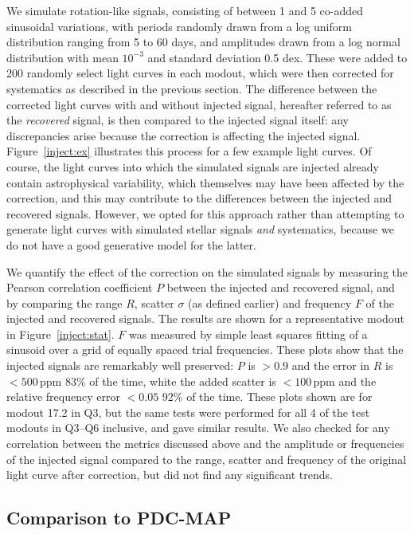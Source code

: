 \documentclass[useAMS,usenatbib]{mn2e}
\begin{document}
We simulate rotation-like signals, consisting of between 1 and 5 co-added
sinusoidal variations, with periods randomly drawn from a log uniform
distribution ranging from 5 to 60 days, and amplitudes drawn from a
log normal distribution with mean $10^{-3}$ and standard deviation 0.5
dex. These were added to 200 randomly select light curves in each
modout, which were then corrected for systematics as described in the
previous section. The difference between the corrected light curves
with and without injected signal, hereafter referred to as the
\emph{recovered} signal, is then compared to the injected
signal itself: any discrepancies arise because the correction is affecting
the injected signal. Figure~\ref{inject:ex} illustrates this process
for a few example light curves. Of course, the light curves into which the
simulated signals are injected already contain astrophysical
variability, which themselves may have been affected by the
correction, and this may contribute to the differences between the
injected and recovered signals. However, we opted for this approach
rather than attempting to generate light curves with simulated stellar
signals \emph{and} systematics, because we do not have a good
generative model for the latter. 

We quantify the effect of the correction on the simulated signals by
measuring the Pearson correlation coefficient $P$ between the injected
and recovered signal, and by comparing the range $R$, scatter $\sigma$
(as defined earlier) and frequency $F$ of the injected and recovered
signals. The results are shown for a representative modout in
Figure~\ref{inject:stat}. $F$ was measured by simple least squares
fitting of a sinusoid over a grid of equally spaced trial
frequencies. These plots show that the injected signals are remarkably
well preserved: $P$ is $>0.9$ and the error in $R$ is $<500$\,ppm 83\%
of the time, white the added scatter is $<100$\,ppm and the relative
frequency error $<0.05$ 92\% of the time. These plots shown are for
modout 17.2 in Q3, but the same tests were performed for all 4 of the
test modouts in Q3--Q6 inclusive, and gave similar results. We also
checked for any correlation between the metrics discussed above and the
amplitude or frequencies of the injected signal compared to the range,
scatter and frequency of the original light curve after correction,
but did not find any significant trends.

\subsection{Comparison to PDC-MAP}
\label{sec:comp}
\end{document}
